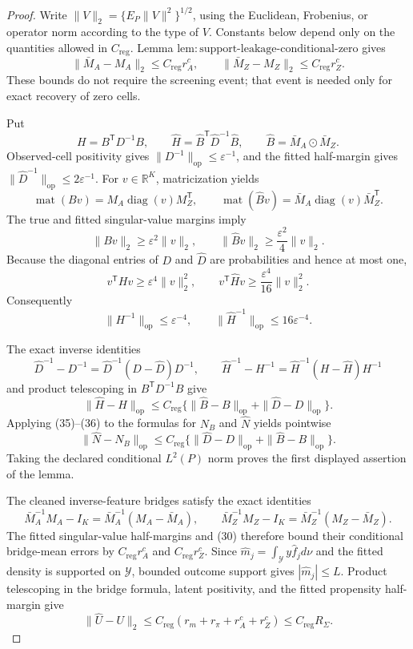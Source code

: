 \documentclass{article}
\begin{document}
\begin{proof}
Write \(\|V\|_2=\{E_P\|V\|^2\}^{1/2}\), using the Euclidean, Frobenius, or operator norm according to the type of \(V\).  Constants below depend only on the quantities allowed in \(C_{\mathrm{reg}}\).  Lemma \(\mathrm{lem{:}support\mbox{-}leakage\mbox{-}conditional\mbox{-}zero}\) gives
\[
 \|\bar M_A-M_A\|_2\leq C_{\mathrm{reg}}r_A^c,
 \qquad
 \|\bar M_Z-M_Z\|_2\leq C_{\mathrm{reg}}r_Z^c. \tag{30}
\]
These bounds do not require the screening event; that event is needed only for exact recovery of zero cells.

Put
\[
 H=B^{\mathsf T}D^{-1}B,\qquad
 \widehat H=\widehat B^{\mathsf T}\widehat D^{-1}\widehat B,
 \qquad \widehat B=\bar M_A\odot\bar M_Z. \tag{31}
\]
Observed-cell positivity gives \(\|D^{-1}\|_{\mathrm{op}}\leq\varepsilon^{-1}\), and the fitted half-margin gives \(\|\widehat D^{-1}\|_{\mathrm{op}}\leq2\varepsilon^{-1}\).  For \(v\in\mathbb R^K\), matricization yields
\[
 \operatorname{mat}(Bv)=M_A\operatorname{diag}(v)M_Z^{\mathsf T},
 \qquad
 \operatorname{mat}(\widehat Bv)=\bar M_A\operatorname{diag}(v)\bar M_Z^{\mathsf T}. \tag{32}
\]
The true and fitted singular-value margins imply
\[
 \|Bv\|_2\geq\varepsilon^2\|v\|_2,
 \qquad
 \|\widehat Bv\|_2\geq\frac{\varepsilon^2}{4}\|v\|_2. \tag{33}
\]
Because the diagonal entries of \(D\) and \(\widehat D\) are probabilities and hence at most one,
\[
 v^{\mathsf T}Hv\geq\varepsilon^4\|v\|_2^2,\qquad
 v^{\mathsf T}\widehat Hv\geq\frac{\varepsilon^4}{16}\|v\|_2^2.
\]
Consequently
\[
 \|H^{-1}\|_{\mathrm{op}}\leq\varepsilon^{-4},
 \qquad
 \|\widehat H^{-1}\|_{\mathrm{op}}\leq16\varepsilon^{-4}. \tag{34}
\]

The exact inverse identities
\[
 \widehat D^{-1}-D^{-1}=\widehat D^{-1}(D-\widehat D)D^{-1},
 \qquad
 \widehat H^{-1}-H^{-1}=\widehat H^{-1}(H-\widehat H)H^{-1} \tag{35}
\]
and product telescoping in \(B^{\mathsf T}D^{-1}B\) give
\[
 \|\widehat H-H\|_{\mathrm{op}}
 \leq C_{\mathrm{reg}}
 \{\|\widehat B-B\|_{\mathrm{op}}+\|\widehat D-D\|_{\mathrm{op}}\}. \tag{36}
\]
Applying (35)--(36) to the formulas for \(N_B\) and \(\widehat N\) yields pointwise
\[
 \|\widehat N-N_B\|_{\mathrm{op}}
 \leq C_{\mathrm{reg}}
 \{\|\widehat D-D\|_{\mathrm{op}}+\|\widehat B-B\|_{\mathrm{op}}\}. \tag{37}
\]
Taking the declared conditional \(L^2(P)\) norm proves the first displayed assertion of the lemma.

The cleaned inverse-feature bridges satisfy the exact identities
\[
 \bar M_A^{-1}M_A-I_K=\bar M_A^{-1}(M_A-\bar M_A),
 \qquad
 \bar M_Z^{-1}M_Z-I_K=\bar M_Z^{-1}(M_Z-\bar M_Z). \tag{38}
\]
The fitted singular-value half-margins and (30) therefore bound their conditional bridge-mean errors by \(C_{\mathrm{reg}}r_A^c\) and \(C_{\mathrm{reg}}r_Z^c\).  Since
\(\widehat m_j=\int_{\mathcal Y}y\widehat f_jd\nu\) and the fitted density is supported on \(\mathcal Y\), bounded outcome support gives \(|\widehat m_j|\leq L\).  Product telescoping in the bridge formula, latent positivity, and the fitted propensity half-margin give
\[
 \|\widehat U-U\|_2
 \leq C_{\mathrm{reg}}(r_m+r_\pi+r_A^c+r_Z^c)
 \leq C_{\mathrm{reg}}R_\Sigma. \tag{39}
\]


\end{proof}
\end{document}
